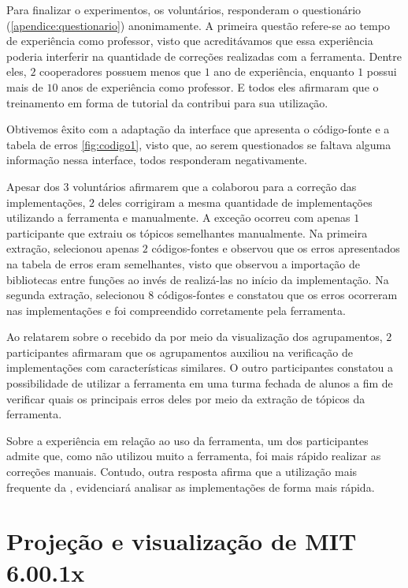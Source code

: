 		Para finalizar o experimentos, os voluntários, responderam o questionário (\cref{apendice:questionario})
		anonimamente. A primeira questão refere-se ao tempo de experiência como professor,
		visto que acreditávamos que essa experiência poderia interferir na quantidade
		de correções realizadas com a ferramenta. Dentre eles, $2$ cooperadores possuem
		menos que $1$ ano de experiência, enquanto $1$ possui mais de $10$ anos de
		experiência como professor. E todos eles afirmaram que o treinamento em forma
		de tutorial da  contribui para sua utilização.
		
		Obtivemos êxito com a adaptação da interface que apresenta o código-fonte e a
		tabela de erros \cref{fig:codigo1}, visto que, ao serem questionados se faltava
		alguma informação nessa interface, todos responderam negativamente.
		
		Apesar dos $3$ voluntários afirmarem que a  colaborou
		para a correção das implementações, $2$ deles corrigiram a mesma quantidade
		de implementações utilizando a ferramenta e manualmente. A exceção ocorreu com 
		apenas $1$ participante que extraiu os tópicos semelhantes manualmente. Na
		primeira extração, selecionou apenas $2$ códigos-fontes e observou que os
		erros apresentados na tabela de erros eram semelhantes, visto que observou
		a importação de bibliotecas entre funções ao invés de realizá-las no início
		da implementação. Na segunda extração, selecionou $8$ códigos-fontes e constatou
		que os erros ocorreram nas implementações e foi compreendido corretamente
		pela ferramenta.
		
		Ao relatarem sobre o  recebido da 
		por meio da visualização dos agrupamentos, $2$ participantes afirmaram que
		os agrupamentos auxiliou na verificação de implementações com características
		similares. O outro participantes constatou a possibilidade de utilizar a
		ferramenta em uma turma fechada de alunos a fim de verificar quais os principais
		erros deles por meio da extração de tópicos da ferramenta.
		
		Sobre a experiência em relação ao uso da ferramenta, um dos participantes
		admite que, como não utilizou muito a ferramenta, foi mais rápido realizar
		as correções manuais. Contudo, outra resposta afirma que a utilização mais
		frequente da , evidenciará analisar as implementações
		de forma mais rápida.
		
	
	
	\section{Projeção e visualização de MIT 6.00.1x}	

